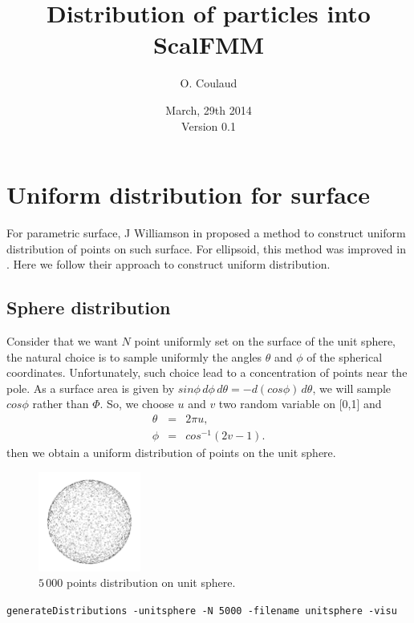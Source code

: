 \documentclass[10pt]{article}
\title{Distribution of particles into ScalFMM}
\author{O. Coulaud}
\date{March, 29th 2014\\\vspace{1cm}Version 0.1}
\begin{document}
\maketitle

\tableofcontents
\newpage
\section{Uniform distribution for surface}

For parametric surface, J  Williamson in \cite{Williamson} proposed a method to construct uniform distribution of points on such surface. For ellipsoid, this method was improved in \cite{ChenGlotzer}. Here we follow their approach to construct uniform distribution.

\subsection{Sphere distribution}
Consider that we want $N$ point uniformly set on the surface of the unit sphere, the natural choice is to sample uniformly the angles $\theta$ and $\phi$ of the spherical coordinates. Unfortunately, such choice lead to a concentration of points near the pole.  As a surface area is given by $sin\phi\,d\phi\,d\theta = -d(cos\phi)\,d\theta$, we will sample $cos\phi$ rather than $\Phi$. So, we choose $u$ and $v$ two  random variable on [0,1] and  
\begin{eqnarray*}
\theta	&=&	2\pi u,\\
\phi	&=&	cos^{-1}(2v-1).
\end{eqnarray*}
then we obtain a uniform distribution of points on the unit sphere.

\begin{figure}[ht]
  \centering
   \includegraphics[width=0.3\textwidth]{unitsphere}
    \caption{$5\,000$ points distribution on unit sphere.}%
\end{figure}
\texttt{generateDistributions -unitsphere   -N 5000 -filename unitsphere -visu }
\end{document}
